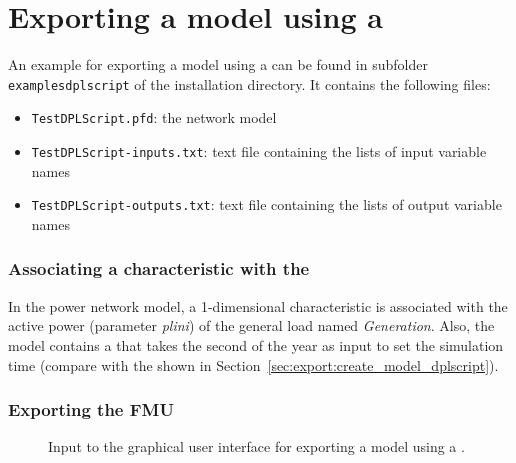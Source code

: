 \newpage

\section{Exporting a model using a \dplscript}
\label{sec:examples:dplscript}

An example for exporting a model using a \dplscript can be found in subfolder  \texttt{examplesdplscript} of the installation directory.
It contains the following files:
\begin{itemize}
  \item \texttt{TestDPLScript.pfd}: the \pf network model
  \item \texttt{TestDPLScript-inputs.txt}: text file containing the lists of input variable names
  \item \texttt{TestDPLScript-outputs.txt}: text file containing the lists of output variable names
\end{itemize}

\subsubsection*{Associating a characteristic with the \dplscript}

In the power network model, a 1-dimensional characteristic is associated with the active power (parameter \emph{plini}) of the general load named \emph{Generation}.
Also, the \pf model contains a \dplscript that takes the second of the year as input to set the simulation time (compare with the \dplscript shown in Section~\ref{sec:export:create_model_dplscript}).

\subsubsection*{Exporting the FMU}

\begin{figure}[h!]
\vspace*{1em}
\caption{Input to the graphical user interface for exporting a model using a \dplscript.}
\label{fig:gui_create_dpl_script}
\end{figure}


